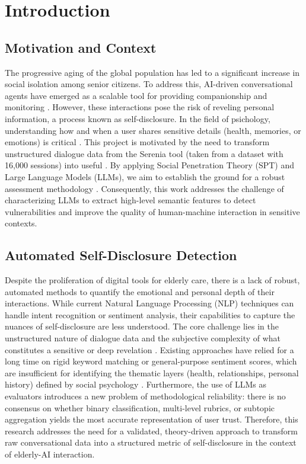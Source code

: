 \section{Introduction}
    \subsection{Motivation and Context}

The progressive aging of the global population has led to a significant increase in social isolation among senior citizens. To address this, AI-driven conversational agents have emerged as a scalable tool for providing companionship and monitoring \cite{Nakamura2022}. However, these interactions pose the risk of reveling  personal information, a process known as self-disclosure.
 \vspace{2mm} \newline
In the field of psichology, understanding how and when a  user shares sensitive details (health, memories, or emotions) is critical \cite{Wu2026}. This project is motivated by the need to transform unstructured dialogue data from the Serenia tool (taken from a dataset with 16,000 sessions) into useful \cite{Ho2018}. By applying Social Penetration Theory (SPT) and Large Language Models (LLMs), we aim to establish the ground for a robust assessment methodology \cite{Laban2021}. Consequently, this work addresses the challenge of characterizing LLMs to extract high-level semantic features to detect vulnerabilities and improve the quality of human-machine interaction in sensitive contexts.


    \subsection{Automated Self-Disclosure Detection}

Despite the proliferation of digital tools for elderly care, there is a lack of robust, automated methods to quantify the emotional and personal depth of their interactions. While current Natural Language Processing (NLP) techniques can handle intent recognition or sentiment analysis, their capabilities to capture the nuances of self-disclosure are less understood.
\vspace{2mm} \newline
The core challenge lies in the unstructured nature of dialogue data and the subjective complexity of what constitutes a sensitive or deep revelation \cite{Krsek2025}. Existing approaches have relied for a long time on rigid keyword matching or general-purpose sentiment scores, which are insufficient for identifying the thematic layers (health, relationships, personal history) defined by social psychology \cite{Cozby1973}. Furthermore, the use of LLMs as evaluators introduces a new problem of methodological reliability: there is no consensus on whether binary classification, multi-level rubrics, or \gls{subtopic} aggregation yields the most accurate representation of user trust. Therefore, this research addresses the need for a validated, theory-driven approach to transform raw conversational data into a structured metric of self-disclosure in the context of elderly-AI interaction.


